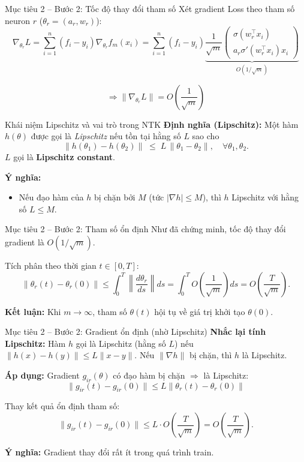 \begin{frame}{Mục tiêu 2 – Bước 2: Tốc độ thay đổi tham số}
  Xét gradient Loss theo tham số neuron $r$ ($\theta_r = (a_r, w_r)$):
  \[
    \nabla_{\theta_r} L 
    = \sum_{i=1}^n (f_i - y_i) \nabla_{\theta_r} f_m(x_i)
    = \sum_{i=1}^n (f_i - y_i) \underbrace{\frac{1}{\sqrt{m}} \begin{pmatrix} \sigma(w_r^\top x_i) \\ a_r \sigma'(w_r^\top x_i) x_i \end{pmatrix}}_{O(1/\sqrt{m})}
  \]
  
  \[
    \Rightarrow \|\nabla_{\theta_r} L\| = O\left(\frac{1}{\sqrt{m}}\right)
  \]
\end{frame}

\begin{frame}{Khái niệm Lipschitz và vai trò trong NTK}
\textbf{Định nghĩa (Lipschitz):}
Một hàm $h(\theta)$ được gọi là \emph{Lipschitz} nếu tồn tại hằng số $L$ sao cho
\[
  \|h(\theta_1) - h(\theta_2)\|
  \;\le\;
  L \, \|\theta_1 - \theta_2\|,
  \quad \forall\theta_1,\theta_2.
\]
$L$ gọi là \textbf{Lipschitz constant}.

\vspace{0.3cm}
\textbf{Ý nghĩa:}
\begin{itemize}
  \item Nếu đạo hàm của $h$ bị chặn bởi $M$ (tức $|\nabla h|\le M$), thì $h$ Lipschitz với hằng số $L\le M$.
\end{itemize}
\end{frame}

\begin{frame}{Mục tiêu 2 – Bước 2: Tham số ổn định}
  Như đã chứng minh, tốc độ thay đổi gradient là $O(1/\sqrt{m})$.
  
  Tích phân theo thời gian $t \in [0,T]$:
  \[
    \|\theta_r(t) - \theta_r(0)\| 
    \le \int_0^T \left\| \frac{d\theta_r}{ds} \right\| ds 
    = \int_0^T O\left(\frac{1}{\sqrt{m}}\right) ds
    = O\left(\frac{T}{\sqrt{m}}\right).
  \]

  \textbf{Kết luận:} Khi $m \to \infty$, tham số $\theta(t)$ hội tụ về giá trị khởi tạo $\theta(0)$.
\end{frame}

\begin{frame}{Mục tiêu 2 – Bước 2: Gradient ổn định (nhờ Lipschitz)}
  \textbf{Nhắc lại tính Lipschitz:}
  Hàm $h$ gọi là Lipschitz (hằng số $L$) nếu $\|h(x)-h(y)\| \le L\|x-y\|$.
  Nếu $\|\nabla h\|$ bị chặn, thì $h$ là Lipschitz.

  \vspace{0.2cm}
  \textbf{Áp dụng:} Gradient $g_{ir}(\theta)$ có đạo hàm bị chặn $\Rightarrow$ là Lipschitz:
  \[
    \|g_{ir}(t) - g_{ir}(0)\| \le L \|\theta_r(t) - \theta_r(0)\|
  \]
  
  Thay kết quả ổn định tham số:
  \[
    \|g_{ir}(t) - g_{ir}(0)\| \le L \cdot O\left(\frac{T}{\sqrt{m}}\right) = O\left(\frac{T}{\sqrt{m}}\right).
  \]

  \textbf{Ý nghĩa:} Gradient thay đổi rất ít trong quá trình train.
\end{frame}

